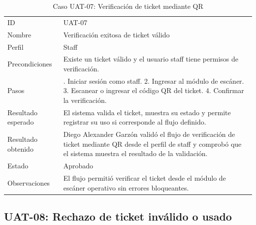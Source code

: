 \documentclass[12pt,letterpaper]{article}
\begin{document}
\begin{table}[H]
\centering
\begingroup
\footnotesize
\setlength{\tabcolsep}{3pt}
\renewcommand{\arraystretch}{1.25}

\begin{tabularx}{\textwidth}{|
>{\raggedright\arraybackslash}p{3.4cm}|
>{\raggedright\arraybackslash}X|}
\hline
\multicolumn{1}{|>{\centering\arraybackslash}m{3.4cm}|}{\textbf{Campo}} &
\multicolumn{1}{>{\centering\arraybackslash}m{10.8cm}|}{\textbf{Contenido}} \\
\hline
ID & UAT-07 \\
\hline
Nombre & Verificación exitosa de ticket válido \\
\hline
Perfil & Staff \\
\hline
Precondiciones & Existe un ticket válido y el usuario staff tiene permisos de verificación. \\
\hline
Pasos & 1. Iniciar sesión como staff. 2. Ingresar al módulo de escáner. 3. Escanear o ingresar el código QR del ticket. 4. Confirmar la verificación. \\
\hline
Resultado esperado & El sistema valida el ticket, muestra su estado y permite registrar su uso si corresponde al flujo definido. \\
\hline
Resultado obtenido & Diego Alexander Garzón validó el flujo de verificación de ticket mediante QR desde el perfil de staff y comprobó que el sistema muestra el resultado de la validación. \\
\hline
Estado & Aprobado \\
\hline
Observaciones & El flujo permitió verificar el ticket desde el módulo de escáner operativo sin errores bloqueantes. \\
\hline
\end{tabularx}

\endgroup
\caption{Caso UAT-07: Verificación de ticket mediante QR}
\label{tab:uat-07-verificacion-qr}
\end{table}

\subsection{UAT-08: Rechazo de ticket inválido o usado}
\end{document}

